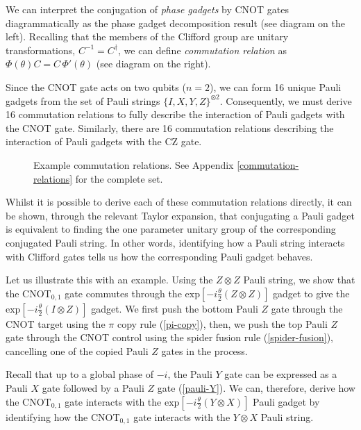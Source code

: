 We can interpret the conjugation of \textit{phase gadgets} by CNOT gates diagrammatically as the phase gadget decomposition result (see diagram on the left). Recalling that the members of the Clifford group are unitary transformations, $C^{-1} = C^\dagger$, we can define \textit{commutation relation} as $\Phi(\theta) C = C \, \Phi'(\theta)$ (see diagram on the right).


Since the CNOT gate acts on two qubits ($n=2$), we can form 16 unique Pauli gadgets from the set of Pauli strings $\{I, X, Y, Z\}^{\otimes 2}$. Consequently, we must derive 16 commutation relations to fully describe the interaction of Pauli gadgets with the CNOT gate. Similarly, there are 16 commutation relations describing the interaction of Pauli gadgets with the CZ gate.

\begin{figure}[H]
    \centering
    \caption{Example commutation relations. See Appendix \ref{commutation-relations} for the complete set.}
\end{figure}

Whilst it is possible to derive each of these commutation relations directly, it can be shown, through the relevant Taylor expansion, that conjugating a Pauli gadget is equivalent to finding the one parameter unitary group of the corresponding conjugated Pauli string. In other words, identifying how a Pauli string interacts with Clifford gates tells us how the corresponding Pauli gadget behaves.

Let us illustrate this with an example. Using the $Z \otimes Z$ Pauli string, we show that the $\text{CNOT}_{0, 1}$ gate commutes through the $\text{exp} \left[ - i\frac{\theta}{2} \left( Z \otimes Z \right) \right]$ gadget to give the $\text{exp} \left[ - i\frac{\theta}{2} \left( I \otimes Z \right) \right]$ gadget. We first push the bottom Pauli $Z$ gate through the CNOT target using the $\pi$ copy rule (\ref{pi-copy}), then, we push the top Pauli $Z$ gate through the CNOT control using the spider fusion rule (\ref{spider-fusion}), cancelling one of the copied Pauli $Z$ gates in the process.


Recall that up to a global phase of $-i$, the Pauli $Y$ gate can be expressed as a Pauli $X$ gate followed by a Pauli $Z$ gate (\ref{pauli-Y}). We can, therefore, derive how the $\text{CNOT}_{0, 1}$ gate interacts with the $\text{exp} \left[ - i\frac{\theta}{2} \left(Y \otimes X \right) \right]$ Pauli gadget by identifying how the CNOT$_{0, 1}$ gate interacts with the $Y \otimes X$ Pauli string.

